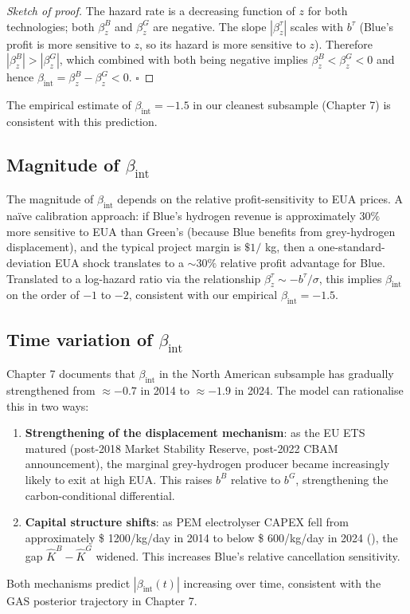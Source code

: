 \documentclass[11pt,a4paper]{article}
\newcommand{\bint}{\beta_{\mathrm{int}}}
\begin{document}
\begin{proof}[Sketch of proof]
The hazard rate is a decreasing function of $z$ for both technologies; both $\beta_z^B$ and $\beta_z^G$ are negative. The slope $|\beta_z^{\tau}|$ scales with $b^{\tau}$ (Blue's profit is more sensitive to $z$, so its hazard is more sensitive to $z$). Therefore $|\beta_z^B| > |\beta_z^G|$, which combined with both being negative implies $\beta_z^B < \beta_z^G < 0$ and hence $\bint = \beta_z^B - \beta_z^G < 0$. \hfill $\square$
\end{proof}

The empirical estimate of $\bint = -1.5$ in our cleanest subsample (Chapter 7) is consistent with this prediction.

\subsection{Magnitude of $\bint$}

The magnitude of $\bint$ depends on the relative profit-sensitivity to EUA prices. A naïve calibration approach: if Blue's hydrogen revenue is approximately $30\%$ more sensitive to EUA than Green's (because Blue benefits from grey-hydrogen displacement), and the typical project margin is $\$ 1/$ kg, then a one-standard-deviation EUA shock translates to a $\sim 30\%$ relative profit advantage for Blue. Translated to a log-hazard ratio via the relationship $\beta_z^{\tau} \sim -b^{\tau} / \sigma$, this implies $\bint$ on the order of $-1$ to $-2$, consistent with our empirical $\bint = -1.5$.

\subsection{Time variation of $\bint$}

Chapter 7 documents that $\bint$ in the North American subsample has gradually strengthened from $\approx -0.7$ in 2014 to $\approx -1.9$ in 2024. The model can rationalise this in two ways:
\begin{enumerate}
    \item \textbf{Strengthening of the displacement mechanism}: as the EU ETS matured (post-2018 Market Stability Reserve, post-2022 CBAM announcement), the marginal grey-hydrogen producer became increasingly likely to exit at high EUA. This raises $b^B$ relative to $b^G$, strengthening the carbon-conditional differential.
    \item \textbf{Capital structure shifts}: as PEM electrolyser CAPEX fell from approximately \$ 1200/kg/day in 2014 to below \$ 600/kg/day in 2024 (\citealp{iea2024hydrogen}), the gap $\hat{K}^B - \hat{K}^G$ widened. This increases Blue's relative cancellation sensitivity.
\end{enumerate}
Both mechanisms predict $|\bint(t)|$ increasing over time, consistent with the GAS posterior trajectory in Chapter 7.
\end{document}
